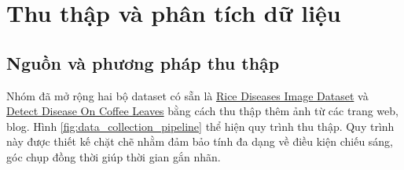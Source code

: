 \section{Thu thập và phân tích dữ liệu}

\subsection{Nguồn và phương pháp thu thập}
Nhóm đã mở rộng hai bộ dataset có sẵn là \href{https://www.kaggle.com/datasets/minhhuy2810/rice-diseases-image-dataset/}{Rice Diseases Image Dataset} và \href{https://github.com/phuvinh010701/CS114-MachineLearning-DetectDiseaseOnCoffeeLeaves}{Detect Disease On Coffee Leaves} bằng cách thu thập thêm ảnh từ các trang web, blog. Hình \ref{fig:data_collection_pipeline} thể hiện quy trình thu thập. Quy trình này được thiết kế chặt chẽ nhằm đảm bảo tính đa dạng về điều kiện chiếu sáng, góc chụp đồng thời giúp thời gian gắn nhãn.


